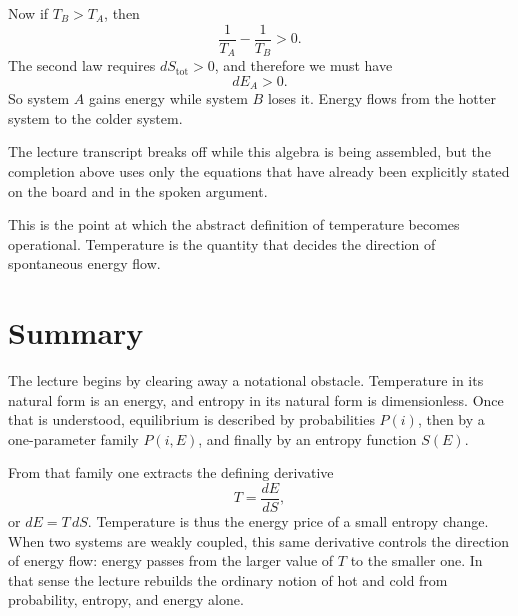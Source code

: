 Now if \(T_B>T_A\), then
\begin{equation}
\frac{1}{T_A}-\frac{1}{T_B} > 0.
\end{equation}
The second law requires \(dS_{\mathrm{tot}}>0\), and therefore we must have
\begin{equation}
dE_A > 0.
\end{equation}
So system \(A\) gains energy while system \(B\) loses it. Energy flows from the hotter system to the colder system.

\begin{remark}
The lecture transcript breaks off while this algebra is being assembled, but the completion above uses only the equations that have already been explicitly stated on the board and in the spoken argument.
\end{remark}

This is the point at which the abstract definition of temperature becomes operational. Temperature is the quantity that decides the direction of spontaneous energy flow.

\section{Summary}

The lecture begins by clearing away a notational obstacle. Temperature in its natural form is an energy, and entropy in its natural form is dimensionless. Once that is understood, equilibrium is described by probabilities \(P(i)\), then by a one-parameter family \(P(i,E)\), and finally by an entropy function \(S(E)\).

From that family one extracts the defining derivative
\[
T=\frac{dE}{dS},
\]
or \(dE=T\,dS\). Temperature is thus the energy price of a small entropy change. When two systems are weakly coupled, this same derivative controls the direction of energy flow: energy passes from the larger value of \(T\) to the smaller one. In that sense the lecture rebuilds the ordinary notion of hot and cold from probability, entropy, and energy alone.